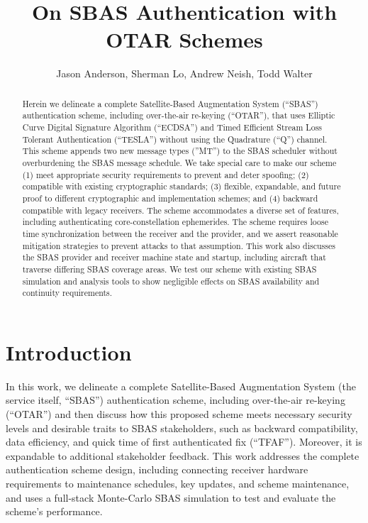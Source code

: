 \documentclass[letterpaper,times]{IONconf/IONconf}
\title{On SBAS Authentication with OTAR Schemes}
\author{Jason Anderson, Sherman Lo, Andrew Neish, Todd Walter}
\begin{document}
	\maketitle

\begin{abstract}
	Herein we delineate a complete Satellite-Based Augmentation System (``SBAS'') authentication scheme, including over-the-air re-keying (``OTAR''), that uses Elliptic Curve Digital Signature Algorithm (``ECDSA'') and Timed Efficient Stream Loss Tolerant Authentication (``TESLA'') without using the Quadrature (``Q'') channel.
	This scheme appends two new message types (''MT'') to the SBAS scheduler without overburdening the SBAS message schedule.
	We take special care to make our scheme (1) meet appropriate security requirements to prevent and deter spoofing; (2) compatible with existing cryptographic standards; (3) flexible, expandable, and future proof to different cryptographic and implementation schemes; and (4) backward compatible with legacy receivers.
	The scheme accommodates a diverse set of features, including authenticating core-constellation ephemerides.
	The scheme requires loose time synchronization between the receiver and the provider, and we assert reasonable mitigation strategies to prevent attacks to that assumption.
	This work also discusses the SBAS provider and receiver machine state and startup, including aircraft that traverse differing SBAS coverage areas.
	We test our scheme with existing SBAS simulation and analysis tools to show negligible effects on SBAS availability and continuity requirements.
\end{abstract}

\section{Introduction} \label{sec:introduction}

	In this work, we delineate a complete Satellite-Based Augmentation System (the service itself, ``SBAS'') authentication scheme, including over-the-air re-keying (``OTAR'') and then discuss how this proposed scheme meets necessary security levels and desirable traits to SBAS stakeholders, such as backward compatibility, data efficiency, and quick time of first authenticated fix (``TFAF'').
	Moreover, it is expandable to additional stakeholder feedback.
	This work addresses the complete authentication scheme design, including connecting receiver hardware requirements to maintenance schedules, key updates, and scheme maintenance, and uses a full-stack Monte-Carlo SBAS simulation to test and evaluate the scheme's performance.
\end{document}
